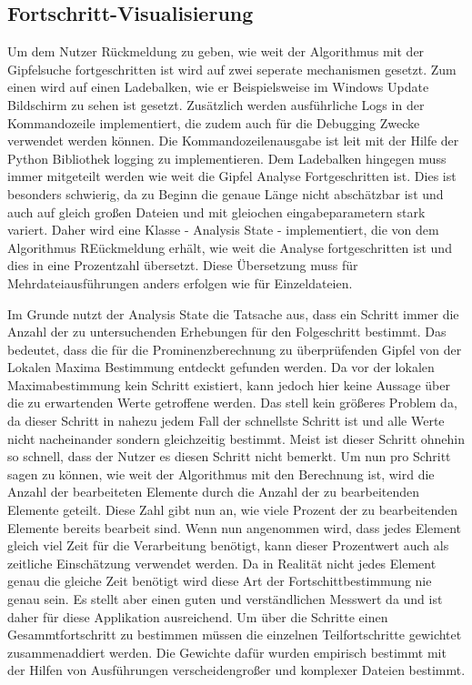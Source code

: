 \subsection{Fortschritt-Visualisierung}
Um dem Nutzer Rückmeldung zu geben, wie weit der Algorithmus mit der Gipfelsuche fortgeschritten ist wird auf zwei seperate mechanismen gesetzt. Zum einen wird auf einen Ladebalken, wie er Beispielsweise im Windows Update Bildschirm zu sehen ist gesetzt. Zusätzlich werden ausführliche Logs in der Kommandozeile implementiert, die zudem auch für die Debugging Zwecke verwendet werden können. Die Kommandozeilenausgabe ist leit mit der Hilfe der Python Bibliothek logging zu implementieren. Dem Ladebalken hingegen muss immer mitgeteilt werden wie weit die Gipfel Analyse Fortgeschritten ist. Dies ist besonders schwierig, da zu Beginn die genaue Länge nicht abschätzbar ist und auch auf gleich großen Dateien und mit gleiochen eingabeparametern stark variert. Daher wird eine Klasse - Analysis State - implementiert, die von dem Algorithmus REückmeldung erhält, wie weit die Analyse fortgeschritten ist und dies in eine Prozentzahl übersetzt. Diese Übersetzung muss für Mehrdateiausführungen anders erfolgen wie für Einzeldateien. 

Im Grunde nutzt der Analysis State die Tatsache aus, dass ein Schritt immer die Anzahl der zu untersuchenden Erhebungen für den Folgeschritt bestimmt. Das bedeutet, dass die für die Prominenzberechnung zu überprüfenden Gipfel von der Lokalen Maxima Bestimmung entdeckt gefunden werden. Da vor der lokalen Maximabestimmung kein Schritt existiert, kann jedoch hier keine Aussage über die zu erwartenden Werte getroffene werden. Das stell kein größeres Problem da, da dieser Schritt in nahezu jedem Fall der schnellste Schritt ist und alle Werte nicht nacheinander sondern gleichzeitig bestimmt. Meist ist dieser Schritt ohnehin so schnell, dass der Nutzer es diesen Schritt nicht bemerkt. Um nun pro Schritt sagen zu können, wie weit der Algorithmus mit den Berechnung ist, wird die Anzahl der bearbeiteten Elemente durch die Anzahl der zu bearbeitenden Elemente geteilt. Diese Zahl gibt nun an, wie viele Prozent der zu bearbeitenden Elemente bereits bearbeit sind. Wenn nun angenommen wird, dass jedes Element gleich viel Zeit für die Verarbeitung benötigt, kann dieser Prozentwert auch als zeitliche Einschätzung verwendet werden. Da in Realität nicht jedes Element genau die gleiche Zeit benötigt wird diese Art der Fortschittbestimmung nie genau sein. Es stellt aber einen guten und verständlichen Messwert da und ist daher für diese Applikation ausreichend. Um über die Schritte einen Gesammtfortschritt zu bestimmen müssen die einzelnen Teilfortschritte gewichtet zusammenaddiert werden. Die Gewichte dafür wurden empirisch  bestimmt mit der Hilfen von Ausführungen verscheidengroßer und komplexer Dateien bestimmt.

